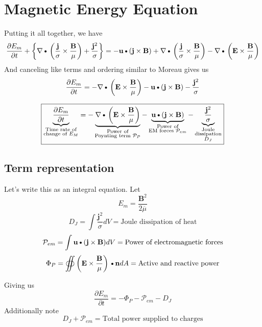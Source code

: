 \documentclass[11pt]{article}
\newcommand{\B}{\mathbf{B}}
\newcommand{\PD}{\partial}
\newcommand{\BM}{\frac{\mathbf{B}}{\mu}}
\newcommand{\J}{\mathbf{j}}
\newcommand{\E}{\mathbf{E}}
\newcommand{\N}{\mathbf{n}}
\newcommand{\JS}{\frac{\mathbf{j}}{\sigma}}
\newcommand{\JSS}{\frac{\mathbf{j}^2}{\sigma}}
\newcommand{\U}{\mathbf{u}}
\newcommand{\MO}{\overline{\mu}}
\newcommand{\DOT}{\text{\textbullet}}
\begin{document}
\section{Magnetic Energy Equation}
Putting it all together, we have
\begin{equation}
	\frac{\PD E_m}{\PD t} + 
	\left\{ \nabla \DOT \left(\JS \times \BM \right) + \JSS \right\} =
	- \U \DOT (\J \times \B) + 
	\nabla \DOT \left(\JS \times \BM \right) -
	\nabla \DOT \left(\E \times \BM \right)
\end{equation}
And canceling like terms and ordering similar to Moreau gives us
\begin{equation}
	\frac{\PD E_m}{\PD t} =
	- \nabla \DOT \left(\E \times \BM \right)
	- \U \DOT (\J \times \B)
	- \JSS
\end{equation}

\begin{equation}
	\boxed{
	\underbrace{\frac{\PD E_m}{\PD t} }_
	{\substack{\text{Time rate of}\\\text{change of $E_M$}}}
	=
	- \underbrace{\nabla \DOT \left(\E \times \BM \right)}_
	{\substack{\text{Power of}\\\text{Poynting term $\mathcal P_{P}$}}}
	- \underbrace{\U \DOT (\J \times \B)}_
	{\substack{\text{Power of}\\\text{EM forces $\mathcal P_{em}$}}}
	- \underbrace{\JSS}_
	{\substack{\text{Joule}\\\text{dissipation}\\\text{$D_J$}}}
	}
\end{equation}
\subsection{Term representation}
Let's write this as an integral equation. Let
\begin{equation}
	E_m = \frac{\B^2}{2 \MO}
\end{equation}
\begin{equation}
	D_J = \int \JSS dV = \text{Joule dissipation of heat}
\end{equation}
\begin{equation}
	\mathcal P_{em} = \int \U \DOT (\J \times \B) dV = \text{Power of electromagnetic forces}
\end{equation}
\begin{equation}
	\Phi_P = \oiint \left( \E \times \BM \right) \DOT \N dA = \text{Active and reactive power}
\end{equation}

Giving us
\begin{equation}
	\boxed{
	\frac{\PD E_m}{\PD t}
	=
	- \Phi_P
	- \mathcal P_{em}
	- D_J
	}
\end{equation}
Additionally note
\begin{equation}
	D_J + \mathcal P_{em} = \text{Total power supplied to charges}
\end{equation}
\end{document}

